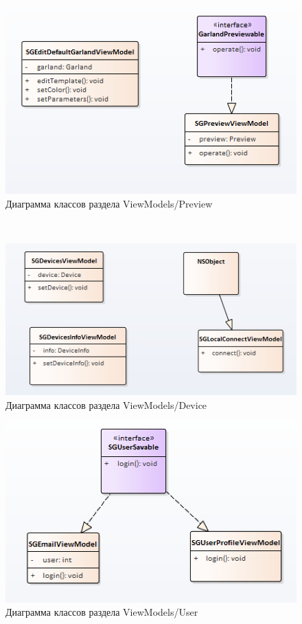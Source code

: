 \begin{figure}[H]
\centering
	\includegraphics[scale=0.5]{figures/diagrams/class/preview.png}
	\caption{Диаграмма классов раздела ViewModels/Preview}
	\label{fig:appendices:classDiagram:preview}
\end{figure}

\newpage
~
\begin{figure}[H]
\centering
	\includegraphics[scale=0.5]{figures/diagrams/class/vm_device.png}
	\caption{Диаграмма классов раздела ViewModels/Device}
	\label{fig:appendices:classDiagram:vm_device}
\end{figure}

\begin{figure}[H]
\centering
	\includegraphics[scale=0.5]{figures/diagrams/class/vm_user.png}
	\caption{Диаграмма классов раздела ViewModels/User}
	\label{fig:appendices:classDiagram:vm_user}
\end{figure}